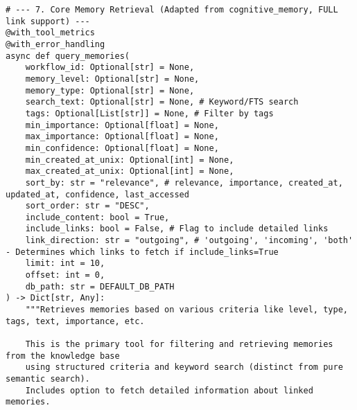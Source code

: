 \documentclass[12pt,a4paper]{article}
\begin{document}
\begin{pageablecode}
\begin{verbatim}
# --- 7. Core Memory Retrieval (Adapted from cognitive_memory, FULL link support) ---
@with_tool_metrics
@with_error_handling
async def query_memories(
    workflow_id: Optional[str] = None,
    memory_level: Optional[str] = None,
    memory_type: Optional[str] = None,
    search_text: Optional[str] = None, # Keyword/FTS search
    tags: Optional[List[str]] = None, # Filter by tags
    min_importance: Optional[float] = None,
    max_importance: Optional[float] = None,
    min_confidence: Optional[float] = None,
    min_created_at_unix: Optional[int] = None,
    max_created_at_unix: Optional[int] = None,
    sort_by: str = "relevance", # relevance, importance, created_at, updated_at, confidence, last_accessed
    sort_order: str = "DESC",
    include_content: bool = True,
    include_links: bool = False, # Flag to include detailed links
    link_direction: str = "outgoing", # 'outgoing', 'incoming', 'both' - Determines which links to fetch if include_links=True
    limit: int = 10,
    offset: int = 0,
    db_path: str = DEFAULT_DB_PATH
) -> Dict[str, Any]:
    """Retrieves memories based on various criteria like level, type, tags, text, importance, etc.

    This is the primary tool for filtering and retrieving memories from the knowledge base
    using structured criteria and keyword search (distinct from pure semantic search).
    Includes option to fetch detailed information about linked memories.


\end{verbatim}
\end{pageablecode}
\end{document}
